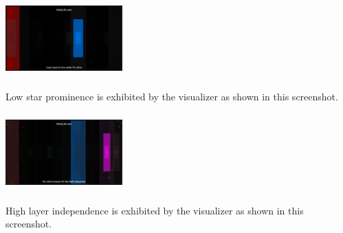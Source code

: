 \documentclass{sigchi-ext}
\begin{document}
\begin{marginfigure}[0pc]
\begin{minipage}{\marginparwidth}
     \includegraphics[width=4.5cm,height=3cm]{figures/LowStarVsisibility.png}
    \caption{Low star prominence is exhibited by the visualizer as shown in this screenshot.}
    \label{fig:lowstar}
    \end{minipage}
\end{marginfigure}

\begin{marginfigure}[0pc]
\begin{minipage}{\marginparwidth}
     \includegraphics[width=4.5cm,height=3cm]{figures/HighLayerIndependence.png}
    \caption{High layer independence is exhibited by the visualizer as shown in this screenshot.}
    \label{fig:highindependence}
    \end{minipage}
\end{marginfigure}

\end{document}
